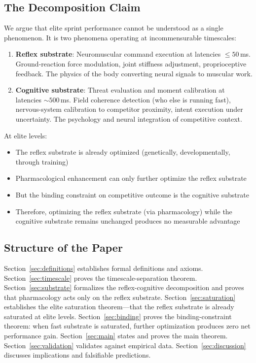 \documentclass[11pt,twocolumn]{article}
\theoremstyle{definition}
\theoremstyle{remark}
\begin{document}
\subsection{The Decomposition Claim}

We argue that elite sprint performance cannot be understood as a single phenomenon. It is two phenomena operating at incommensurable timescales:

\begin{enumerate}[leftmargin=1.2em]
\item \textbf{Reflex substrate}: Neuromuscular command execution at latencies $\le 50$\,ms. Ground-reaction force modulation, joint stiffness adjustment, proprioceptive feedback. The physics of the body converting neural signals to muscular work.

\item \textbf{Cognitive substrate}: Threat evaluation and moment calibration at latencies $\sim 500$\,ms. Field coherence detection (who else is running fast), nervous-system calibration to competitor proximity, intent execution under uncertainty. The psychology and neural integration of competitive context.
\end{enumerate}

At elite levels:
\begin{itemize}[leftmargin=1.2em]
\item The reflex substrate is already optimized (genetically, developmentally, through training)
\item Pharmacological enhancement can only further optimize the reflex substrate
\item But the binding constraint on competitive outcome is the cognitive substrate
\item Therefore, optimizing the reflex substrate (via pharmacology) while the cognitive substrate remains unchanged produces no measurable advantage
\end{itemize}

\subsection{Structure of the Paper}

Section~\ref{sec:definitions} establishes formal definitions and axioms. Section~\ref{sec:timescale} proves the timescale-separation theorem. Section~\ref{sec:substrate} formalizes the reflex-cognitive decomposition and proves that pharmacology acts only on the reflex substrate. Section~\ref{sec:saturation} establishes the elite saturation theorem—that the reflex substrate is already saturated at elite levels. Section~\ref{sec:binding} proves the binding-constraint theorem: when fast substrate is saturated, further optimization produces zero net performance gain. Section~\ref{sec:main} states and proves the main theorem. Section~\ref{sec:validation} validates against empirical data. Section~\ref{sec:discussion} discusses implications and falsifiable predictions.
\end{document}
